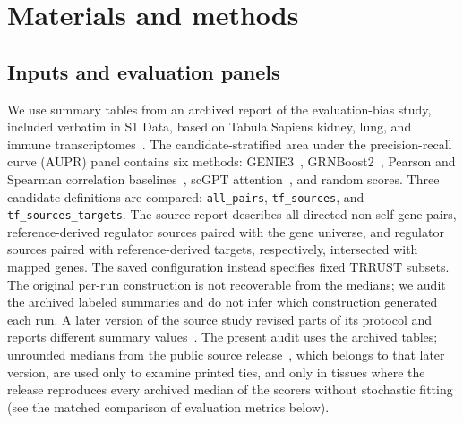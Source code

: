 \documentclass[10pt,letterpaper]{article}
\begin{document}
\section*{Materials and methods}

\subsection*{Inputs and evaluation panels}
We use summary tables from an archived report of the evaluation-bias study, included verbatim in S1 Data, based on Tabula Sapiens kidney, lung, and immune transcriptomes~\cite{tabula2022}. The candidate-stratified area under the precision-recall curve (AUPR) panel contains six methods: GENIE3~\cite{huynhthu2010genie3}, GRNBoost2~\cite{moerman2019grnboost2}, Pearson and Spearman correlation baselines~\cite{langfelder2008wgcna}, scGPT attention~\cite{cui2024scgpt,jain2019attention}, and random scores. Three candidate definitions are compared: \texttt{all\_pairs}, \texttt{tf\_sources}, and \texttt{tf\_sources\_targets}. The source report describes all directed non-self gene pairs, reference-derived regulator sources paired with the gene universe, and regulator sources paired with reference-derived targets, respectively, intersected with mapped genes. The saved configuration instead specifies fixed TRRUST subsets. The original per-run construction is not recoverable from the medians; we audit the archived labeled summaries and do not infer which construction generated each run. A later version of the source study revised parts of its protocol and reports different summary values~\cite{kendiukhov2026evalpreprint}. The present audit uses the archived tables; unrounded medians from the public source release~\cite{kendiukhov2026evalrelease}, which belongs to that later version, are used only to examine printed ties, and only in tissues where the release reproduces every archived median of the scorers without stochastic fitting (see the matched comparison of evaluation metrics below).
\end{document}
